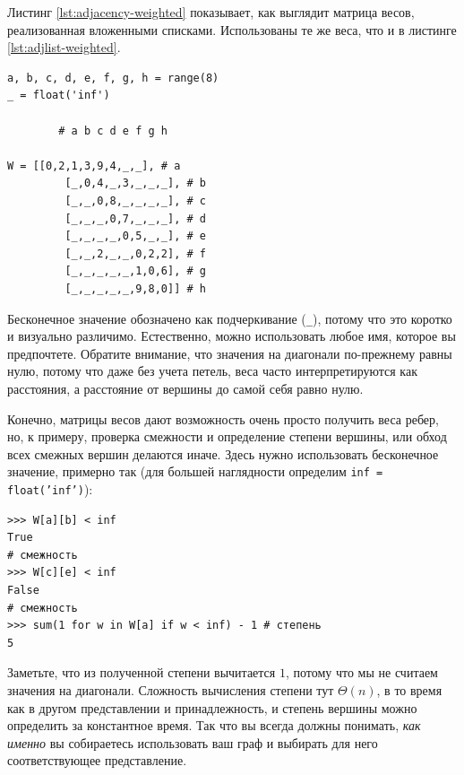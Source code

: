 Листинг \ref{lst:adjacency-weighted} показывает, как выглядит матрица весов, реализованная вложенными списками. Использованы те же веса, что и в листинге \ref{lst:adjlist-weighted}.

\begin{lstlisting}[caption={Матрица весов с бесконечными значениями для отсутствующих ребер}, label={lst:adjacency-weighted}]
a, b, c, d, e, f, g, h = range(8)
_ = float('inf')

		# a b c d e f g h

W = [[0,2,1,3,9,4,_,_], # a
	 	 [_,0,4,_,3,_,_,_], # b
		 [_,_,0,8,_,_,_,_], # c
		 [_,_,_,0,7,_,_,_], # d
		 [_,_,_,_,0,5,_,_], # e
		 [_,_,2,_,_,0,2,2], # f
		 [_,_,_,_,_,1,0,6], # g
		 [_,_,_,_,_,9,8,0]] # h
\end{lstlisting}

Бесконечное значение обозначено как подчеркивание (\texttt{\_}), потому что это коротко и визуально различимо. Естественно, можно использовать любое имя, которое вы предпочтете. Обратите внимание, что значения на диагонали по-прежнему равны нулю, потому что даже без учета петель, веса часто интерпретируются как расстояния, а расстояние от вершины до самой себя равно нулю.

Конечно, матрицы весов дают возможность очень просто получить веса ребер, но, к примеру, проверка смежности и определение степени вершины, или обход всех смежных вершин делаются иначе. Здесь нужно использовать бесконечное значение, примерно так (для большей наглядности определим \texttt{inf = float('inf')}):
\begin{lstlisting}
>>> W[a][b] < inf
True
# смежность
>>> W[c][e] < inf
False
# смежность
>>> sum(1 for w in W[a] if w < inf) - 1 # степень
5
\end{lstlisting}

Заметьте, что из полученной степени вычитается $1$, потому что мы не считаем значения на диагонали. Сложность вычисления степени тут $\Theta(n)$, в то время как в другом представлении и принадлежность, и степень вершины можно определить за константное время. Так что  вы всегда должны понимать, \textit{как именно} вы собираетесь использовать ваш граф и выбирать для него соответствующее представление.

